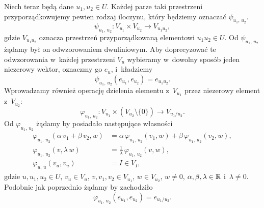 \documentclass[a4paper,11pt]{article}
\begin{document}
Niech teraz będą dane $u_{ 1 }, u_{ 2 } \in U$. Każdej parze taki przestrzeni
przyporządkowujemy pewien rodzaj iloczynu, który będziemy oznaczać
$\psi_{ u_{ 1 }, \, u_{ 2 } }$.
\begin{equation}
  \label{eq:Mechanika-Rozwazania-ogolne-07}
  \psi_{ u_{ 1 }, \, u_{ 2 } } :
  V_{ u_{ 1 } } \times V_{ u_{ 2 } } \to V_{ u_{ 1 } u_{ 2 } },
\end{equation}
gdzie $V_{ u_{ 1 } u _{ 2 } }$ oznacza przestrzeń przyporządkowaną elementowi
$u_{ 1 } u_{ 2 } \in U$. Od $\psi_{ u_{ 1 }, \, u_{ 2 } }$ żądamy był on
odwzorowaniem dwuliniowym. Aby doprecyzować te odwzorowania w~każdej
przestrzeni $V_{ u }$ wybieramy w~dowolny sposób jeden niezerowy wektor,
oznaczmy go $e_{ u }$, i~kładziemy
\begin{equation}
  \label{eq:Mechanika-Rozwazania-ogolne-08}
  \psi_{ u_{ 1 }, \, u_{ 2 } }( e_{ u_{ 1 } }, e_{ u_{ 2 } } ) = e_{ u_{ 1 } u_{ 2 } }.
\end{equation}
Wprowadzamy również operację dzielenia elementu z~$V_{ u_{ 1 } }$ przez
niezerowy element z~$V_{ u_{ 2 } }$:
\begin{equation}
  \label{eq:Mechanika-Rozwazania-ogolne-09}
  \varphi_{ u_{ 1 },\, u_{ 2 } } :
  V_{ u_{ 1 } } \times ( V_{ u_{ 2 } } \setminus \{ 0 \} ) \to V_{ u_{ 1 } / u_{ 2 } }.
\end{equation}
Od $\varphi_{ u_{ 1 }, \, u_{ 2 } }$ żądamy by posiadało następujące własności
\begin{subequations}
  \begin{align}
    \label{eq:Mechanika-Rozwazania-ogolne-10-A}
    \varphi_{ u_{ 1 }, \, u_{ 2 } }( \alpha \, v_{ 1 } + \beta \, v_{ 2 }, w )
    &= \alpha \, \varphi_{ u_{ 1 }, \, u_{ 2 } }( v_{ 1 }, w )
      + \beta \, \varphi_{ u_{ 1 }, \, u_{ 2 } }( v_{ 2 }, w ), \\
    \label{eq:Mechanika-Rozwazania-ogolne-10-B}
    \varphi_{ u_{ 1 }, \, u_{ 2 } }( v, \lambda \, w )
    &= \frac{ 1 }{ \lambda } \, \varphi_{ u_{ 1 }, \, u_{ 2 } }( v, w ), \\
    \label{eq:Mechanika-Rozwazania-ogolne-10-C}
    \varphi_{ u, \, u }( v_{ u }, v_{ u } ) &= I \in V_{ I },
  \end{align}
\end{subequations}
gdzie $u, u_{ 1 }, u_{ 2 } \in U$, $v_{ u } \in V_{ u }$,
$v, v_{ 1 }, v_{ 2 } \in V_{ u_{ 1 } }$, $w \in V_{ u_{ 2 } }$, $w \neq 0$,
$\alpha, \beta, \lambda \in \mathbb{R}$ i~$\lambda \neq 0$. Podobnie jak poprzednio żądamy by zachodziło
\begin{equation}
  \label{eq:Mechanika-Rozwazania-ogolne-11}
  \varphi_{ u_{ 1 }, \, u_{ 2 } }( e_{ u_{ 1 } }, e_{ u_{ 2 } } ) = e_{ u_{ 1 } / u_{ 2 } }.
\end{equation}
\end{document}
